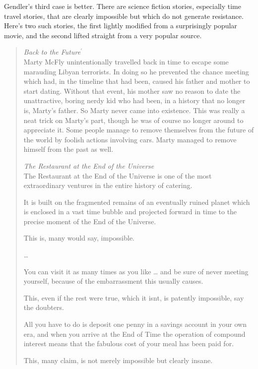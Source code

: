 Gendler's third case is better. There are science fiction stories, especially time travel stories, that are clearly impossible but which do not generate resistance. Here's two such stories, the first lightly modified from a surprisingly popular movie, and the second lifted straight from a very popular source.

\begin{quote}
\textit{Back to the Future\(^\prime\)} \\
Marty McFly unintentionally travelled back in time to escape some marauding Libyan terrorists. In doing so he prevented the chance meeting which had, in the timeline that had been, caused his father and mother to start dating. Without that event, his mother saw no reason to date the unattractive, boring nerdy kid who had been, in a history that no longer is, Marty's father. So Marty never came into existence. This was really a neat trick on Marty's part, though he was of course no longer around to appreciate it. Some people manage to remove themselves from the future of the world by foolish actions involving cars. Marty managed to remove himself from the past as well.

\bigskip

\textit{The Restaurant at the End of the Universe} \\
The Restaurant at the End of the Universe is one of the most extraordinary ventures in the entire history of catering. 

It is built on the fragmented remains of an eventually ruined planet which is enclosed in a vast time bubble and projected forward in time to the precise moment of the End of the Universe.

This is, many would say, impossible.

{\dots}

You can visit it as many times as you like {\dots} and be sure of never meeting yourself, because of the embarrassment this usually causes.

This, even if the rest were true, which it isn{\textquotesingle}t, is patently impossible, say the doubters.

All you have to do is deposit one penny in a savings account in your own era, and when you arrive at the End of Time the operation of compound interest means that the fabulous cost of your meal has been paid for. 

This, many claim, is not merely impossible but clearly insane. \cite[213-214]{Adams1980}
\end{quote}

